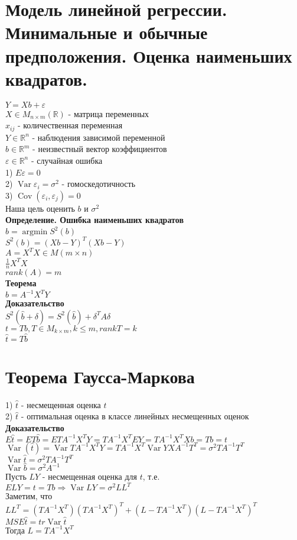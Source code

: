 \documentclass{article}
\newcommand\0{\mathbb{0}}
\DeclareMathOperator{\Var}{Var}
\DeclareMathOperator{\Cov}{Cov}
\DeclareMathOperator{\argmin}{argmin}
\newcommand\1{\mathbb{1}}
\renewcommand{\bf}{\textbf}
\newcommand{\Rto}{\Rightarrow}
\begin{document}
\section{Модель линейной регрессии. Минимальные и обычные предположения. Оценка наименьших квадратов.}
$Y = Xb + \varepsilon$\\
$X \in M_{n \times m}(\mathbb{R})$ - матрица переменных\\
$x_{ij}$ - количественная переменная\\
$Y \in \mathbb{R}^n$ - наблюдения зависимой переменной\\
$b \in \mathbb{R}^m$ - неизвестный вектор коэффициентов\\
$\varepsilon \in \mathbb{R}^n$ - случайная ошибка\\
1) $E\varepsilon = 0$\\
2) $\Var \varepsilon_i = \sigma^2$ - гомоскедотичность\\
3) $\Cov(\varepsilon_i, \varepsilon_j) = 0$\\
Наша цель оценить $b$ и $\sigma^2$\\
\bf{Определение. Ошибка наименьших квадратов}\\
$\widehat{b} = \argmin S^2(b)$\\
$S^2(b) = (Xb - Y)^T(Xb - Y)$\\
$A = X^T X \in M(m \times n)$\\
$\frac{1}{n}X^T X$\\
$rank(A) = m$\\
\bf{Теорема}\\
$\widehat{b} = A^{-1}X^T Y$\\
\bf{Доказательство}\\
$S^2(\widehat{b} + \delta) = S^2(\widehat{b}) + \delta^T A \delta$\\ %
$t = T b, T \in M_{k \times m}, k \leq m, rank T = k$\\
$\widehat{t} = T \widehat{b}$\\
\section{Теорема Гаусса-Маркова}
1) $\widehat{t}$ - несмещенная оценка $t$\\
2) $\widehat{t}$ - оптимальная оценка в классе линейных несмещенных оценок\\
\bf{Доказательство}\\
$E\widehat{t} = ET\widehat{b} = ETA^{-1}X^TY = TA^{-1}X^TEY = TA^{-1}X^TXb = Tb = t$\\
$\Var(\widehat{t}) = \Var TA^{-1}X^TY = TA^{-1}X^T \Var Y X A^{-1}T^T = \sigma^2 TA^{-1}T^T$\\
$\Var \widehat{t} = \sigma^2 TA^{-1}T^T$\\
$\Var \widehat{b} = \sigma^2 A^{-1}$\\
Пусть $LY$ - несмещенная оценка для $t$, т.е.\\
$ELY = t = Tb \Rto \Var LY = \sigma^2 L L^T$\\
Заметим, что $LL^T = (TA^{-1}X^T)(TA^{-1}X^T)^T + (L - TA^{-1}X^T)(L - TA^{-1}X^T)^T$\\
$MSE \widehat{t} = tr \Var \widehat{t}$\\
Тогда $L = TA^{-1}X^T$\\
\\
\end{document}
